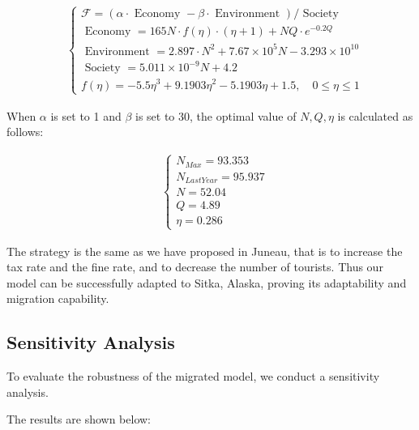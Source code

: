 \begin{equation}
    \begin{aligned}
    &\left\{\begin{array}{l}
    \mathcal{F}=(\alpha \cdot \text { Economy }-\beta \cdot \text { Environment }) / \text { Society } \\[10pt]
    \text { Economy }=165 N \cdot f(\eta) \cdot (\eta+1)+NQ\cdot e^{-0.2 Q} \\[10pt]
    \text { Environment }=2.897 \cdot N^2+ 7.67\times 10^5 N- 3.293\times 10^{10} \\[10pt]
    \text { Society }=5.011\times 10^{-9} N + 4.2 \\[10pt]
    f(\eta)=-5.5 \eta^3+9.1903 \eta^2-5.1903 \eta+1.5, \quad 0 \leq \eta \leq 1
    \end{array}\right.
    \end{aligned}
\end{equation}

When $\alpha$ is set to 1 and $\beta$ is set to 30, 
the optimal value of $N,Q,\eta$ is calculated as follows:

\begin{equation}
    \begin{aligned}
    &\left\{\begin{array}{l}
    N_{Max} = 93.353 \\[10pt]
    N_{LastYear} = 95.937 \\[10pt]
    N=52.04 \\[10pt]
    Q=4.89 \\[10pt]
    \eta=0.286
    \end{array}\right.
    \end{aligned}
\end{equation}

The strategy is the same as we have proposed in Juneau, 
that is to increase the tax rate and the fine rate, and to 
decrease the number of tourists. Thus our model can be successfully
adapted to Sitka, Alaska, proving its adaptability and migration capability.

\subsection{Sensitivity Analysis}

To evaluate the robustness of the migrated model, we conduct a sensitivity analysis.

The results are shown below:

